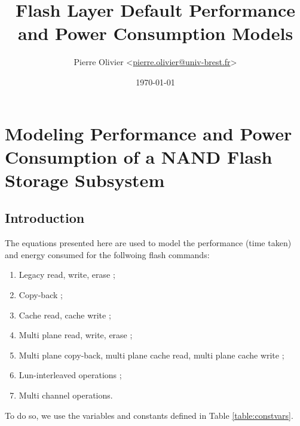 \documentclass[oneside]{memoir}
\begin{document}
\title{\textbf{Flash Layer Default Performance and Power Consumption Models}}
\author{Pierre Olivier <\href{mailto:pierre.olivier@univ-brest.fr}{pierre.olivier@univ-brest.fr}>}
\date{\today}

\maketitle

\tableofcontents

\chapter{Modeling Performance and Power Consumption of a NAND Flash Storage Subsystem}

\section{Introduction}

The equations presented here are used to model the performance (time taken) and energy consumed for the follwoing flash commands:

\begin{enumerate}
  \item Legacy read, write, erase ;
  \item Copy-back ;
  \item Cache read, cache write ;
  \item Multi plane read, write, erase ;
  \item Multi plane copy-back, multi plane cache read, multi plane cache write ;
  \item Lun-interleaved operations ;
  \item Multi channel operations.
\end{enumerate}

To do so, we use the variables and constants defined in Table \ref{table:constvars}.
\end{document}
